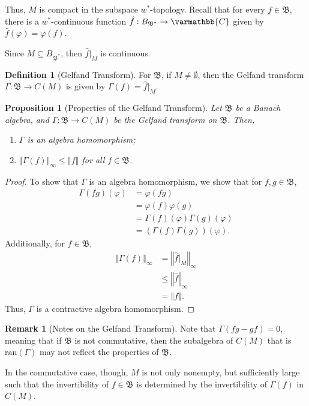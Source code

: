 \documentclass[10pt]{extarticle}
\newcommand{\C}{\mathbb{C}}
\newcommand{\norm}[1]{\left\Vert #1\right\Vert}
\theoremstyle{plain}
\newtheorem*{proposition}{Proposition}
\theoremstyle{definition}
\newtheorem*{definition}{Definition}
\theoremstyle{note}
\newtheorem*{remark}{Remark}
\renewcommand*{\mathbb}[1]{\varmathbb{#1}}
\renewcommand{\newline}{\hfill\break}
\begin{document}
Thus, $M$ is compact in the subspace $w^{\ast}$-topology. Recall that for every $f\in \mathfrak{B}$, there is a $w^{\ast}$-continuous function $\hat{f}: B_{\mathfrak{B}^{\ast}}\rightarrow \C$ given by $\hat{f}(\varphi) = \varphi(f)$.\newline

Since $M\subseteq B_{\mathfrak{B}^{\ast}}$, then $\hat{f}|_{M}$ is continuous.
\begin{definition}[Gelfand Transform]
  For $\mathfrak{B}$, if $M\neq \emptyset$, then the Gelfand transform $\Gamma: \mathfrak{B}\rightarrow C(M)$ is given by $\Gamma(f) = \hat{f}|_{M}$.
\end{definition}
\begin{proposition}[Properties of the Gelfand Transform]
  Let $\mathfrak{B}$ be a Banach algebra, and $\Gamma: \mathfrak{B}\rightarrow C(M)$ be the Gelfand transform on $\mathfrak{B}$. Then,
  \begin{enumerate}[(1)]
    \item $\Gamma$ is an algebra homomorphism;
    \item $\norm{\Gamma(f)}_{\infty} \leq \norm{f}$ for all $f\in \mathfrak{B}$.
  \end{enumerate}
\end{proposition}
\begin{proof}
  To show that $\Gamma$ is an algebra homomorphism, we show that for $f,g\in \mathfrak{B}$,
  \begin{align*}
    \Gamma(fg)(\varphi) &= \varphi(fg) \\
                        &= \varphi(f)\varphi(g)\\
                        &= \Gamma(f)(\varphi)\Gamma(g)(\varphi)\\
                        &= \left(\Gamma(f)\Gamma(g)\right)(\varphi).
  \end{align*}
  Additionally, for $f\in \mathfrak{B}$,
  \begin{align*}
    \norm{\Gamma(f)}_{\infty} &= \norm{\hat{f}|_{M}}_{\infty}\\
                              &\leq \norm{\hat{f}}_{\infty}\\
                              &= \norm{f}.
  \end{align*}
  Thus, $\Gamma$ is a contractive algebra homomorphism.
\end{proof}
\begin{remark}[Notes on the Gelfand Transform]
  Note that $\Gamma(fg - gf) = 0$, meaning that if $\mathfrak{B}$ is not commutative, then the subalgebra of $C(M)$ that is $\text{ran}\left(\Gamma\right)$ may not reflect the properties of $\mathfrak{B}$.\newline

  In the commutative case, though, $M$ is not only nonempty, but sufficiently large such that the invertibility of $f\in \mathfrak{B}$ is determined by the invertibility of $\Gamma(f)$ in $C(M)$.
\end{remark}
\end{document}
